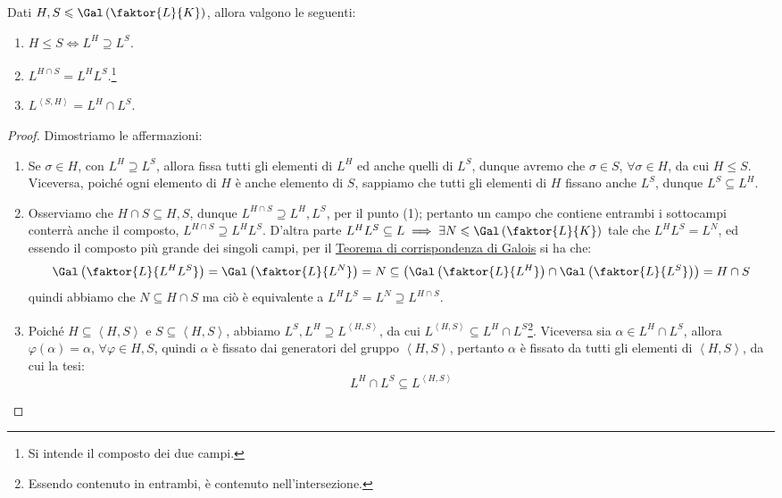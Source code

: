 \documentclass[11pt]{scrartcl}
\begin{document}
\begin{proposition}
Dati $H,S \leqslant \Gal\left(\faktor{L}{K}\right)$, allora valgono le seguenti:
\begin{enumerate}[(1)]
    \item $H \leqslant  S \iff L^H \supseteq L^S$.
    \item $L^{H \cap S} = L^H L^S$.\footnote{Si intende il composto dei due campi.} 
    \item $L^{\left<S,H\right>} = L^H \cap L^S$.
\end{enumerate}
\end{proposition}

\begin{proof}
Dimostriamo le affermazioni:
\begin{enumerate}[(1)]
    \item Se $\sigma \in H$, con $L^H \supseteq L^S$, allora fissa tutti gli elementi di $L^H$ ed anche quelli di $L^S$, dunque avremo che $\sigma \in S$, $\forall \sigma \in H$, da cui $H \leqslant S$. Viceversa,
    poiché ogni elemento di $H$ è anche elemento di $S$, sappiamo che tutti gli elementi di $H$ fissano anche $L^S$, dunque $L^S \subseteq L^H$.
    \item Osserviamo che $H \cap S \subseteq H,S$, dunque $L^{H\cap S} \supseteq L^H,L^S$, per il punto (1); pertanto un campo che contiene entrambi i sottocampi 
    conterrà anche il composto, $L^{H \cap S} \supseteq L^H L^S$. D'altra parte $L^H L^S \subseteq L \implies \exists N \leqslant \Gal\left(\faktor{L}{K}\right) $
    tale che $L^H L^S = L^N$, ed essendo il composto più grande dei singoli campi, per il \hyperref[corrG]{Teorema di corrispondenza di Galois} si ha che:
    \[ \Gal\left(\faktor{L}{L^HL^S}\right) = \Gal\left(\faktor{L}{L^N}\right) = N \subseteq \left(\Gal\left(\faktor{L}{L^H}\right) \cap \Gal\left(\faktor{L}{L^S}\right)\right) = H \cap S
        \]
    quindi abbiamo che $N \subseteq H \cap S$ ma ciò è equivalente a $ L^HL^S= L^N \supseteq L^{H \cap S}$.
    \item Poiché $H \subseteq \left<H,S\right>$ e $S \subseteq \left<H,S\right>$, abbiamo $L^S,L^H \supseteq L^{\left<H,S\right>}$, da cui $L^{\left<H,S\right>} \subseteq L^H \cap L^S$\footnote{Essendo contenuto in entrambi, è contenuto nell'intersezione.}.
    Viceversa sia $\alpha \in L^H \cap L^S$, allora $\varphi(\alpha) = \alpha$, $\forall \varphi \in H,S$, quindi $\alpha$ è fissato dai generatori
    del gruppo $\left<H,S\right>$, pertanto $\alpha$ è fissato da tutti gli elementi di $\left<H,S\right>$, da cui la tesi:
    \[ L^H \cap L^S \subseteq L^{\left<H,S\right>}
        \]
\end{enumerate}
\end{proof}
\end{document}
